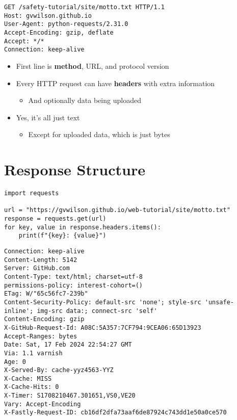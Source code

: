 \documentclass[krantzl]{krantz}
\newcommand{\glossref}[1]{\textbf{#1}}
\begin{document}
\begin{lstlisting}[frame=tblr,backgroundcolor=\color{black!5}]
GET /safety-tutorial/site/motto.txt HTTP/1.1
Host: gvwilson.github.io
User-Agent: python-requests/2.31.0
Accept-Encoding: gzip, deflate
Accept: */*
Connection: keep-alive
\end{lstlisting}

\begin{itemize}
\item First line is \glossref{method}, URL, and protocol version

\item Every HTTP request can have \glossref{headers} with extra information\begin{itemize}
\item And optionally data being uploaded

\end{itemize}


\item Yes, it’s all just text\begin{itemize}
\item Except for uploaded data, which is just bytes

\end{itemize}


\end{itemize}
\section{Response Structure}
\begin{lstlisting}[frame=tblr]
import requests

url = "https://gvwilson.github.io/web-tutorial/site/motto.txt"
response = requests.get(url)
for key, value in response.headers.items():
    print(f"{key}: {value}")
\end{lstlisting}

\begin{lstlisting}[frame=tblr,backgroundcolor=\color{black!5}]
Connection: keep-alive
Content-Length: 5142
Server: GitHub.com
Content-Type: text/html; charset=utf-8
permissions-policy: interest-cohort=()
ETag: W/"65c56fc7-239b"
Content-Security-Policy: default-src 'none'; style-src 'unsafe-inline'; img-src data:; connect-src 'self'
Content-Encoding: gzip
X-GitHub-Request-Id: A08C:5A357:7CF794:9CEA06:65D13923
Accept-Ranges: bytes
Date: Sat, 17 Feb 2024 22:54:27 GMT
Via: 1.1 varnish
Age: 0
X-Served-By: cache-yyz4563-YYZ
X-Cache: MISS
X-Cache-Hits: 0
X-Timer: S1708210467.301651,VS0,VE20
Vary: Accept-Encoding
X-Fastly-Request-ID: cb16df2dfa73aaf6de87924c743dd1e50a0ce570
\end{lstlisting}
\end{document}
